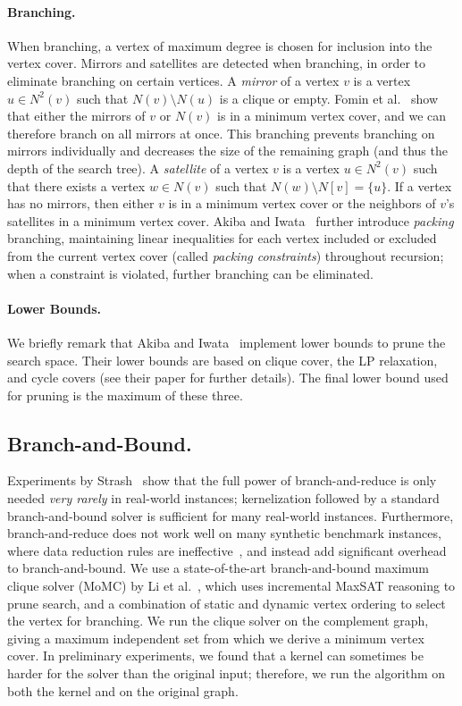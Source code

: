 \documentclass[twoside,leqno,twocolumn]{article}
\begin{document}
\paragraph*{Branching.}
When branching, a vertex of maximum degree is chosen for inclusion into the vertex cover. Mirrors and satellites are detected when branching, in order to eliminate branching on certain vertices. A \emph{mirror} of a vertex $v$ is a vertex $u\in N^2(v)$ such that $N(v)\setminus N(u)$ is a clique or empty. Fomin et al.~\cite{fomin2009measure} show that either the mirrors of $v$ or $N(v)$ is in a minimum vertex cover, and we can therefore branch on all mirrors at once. This branching prevents branching on mirrors individually and decreases the size of the remaining graph (and thus the depth of the search tree). A \emph{satellite} of a vertex $v$ is a vertex $u\in N^2(v)$ such that there exists a vertex $w\in N(v)$ such that $N(w)\setminus N[v] = \{u\}$. If a vertex has no mirrors, then either $v$ is in a minimum vertex cover or the neighbors of $v$'s satellites in a minimum vertex cover. Akiba and Iwata~\cite{akiba-tcs-2016} further introduce \emph{packing} branching, maintaining linear inequalities for each vertex included or excluded from the current vertex cover (called \emph{packing constraints}) throughout recursion; when a constraint is violated, further branching can be eliminated.

\paragraph*{Lower Bounds.} We briefly remark that Akiba and Iwata~\cite{akiba-tcs-2016} implement lower bounds to prune the search space. Their lower bounds are based on clique cover, the LP relaxation, and cycle covers (see their paper for further details). The final lower bound used for pruning is the maximum of these three.

\subsection{Branch-and-Bound.} Experiments by Strash~\cite{strash2016power} show that the full power of branch-and-reduce is only needed \emph{very rarely} in real-world instances; kernelization followed by a standard branch-and-bound solver is sufficient for many real-world instances. Furthermore, branch-and-reduce does not work well on many synthetic benchmark instances, where data reduction rules are ineffective~\cite{akiba-tcs-2016}, and instead add significant overhead to branch-and-bound. We use a state-of-the-art branch-and-bound maximum clique solver (MoMC) by Li et al.~\cite{DBLP:journals/cor/LiJM17}, which uses incremental MaxSAT reasoning to prune search, and a combination of static and dynamic vertex ordering to select the vertex for branching. We run the clique solver on the complement graph, giving a maximum independent set from which we derive a minimum vertex cover. In preliminary experiments, we found that a kernel can sometimes be harder for the solver than the original input; therefore, we run the algorithm on both the kernel and on the original graph.
\end{document}
